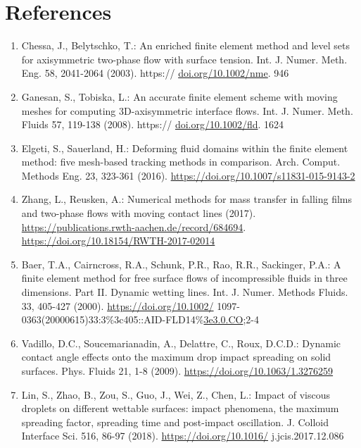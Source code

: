 \documentclass[10pt]{article}
\begin{document}
\section*{References}
\begin{enumerate}
  \item Chessa, J., Belytschko, T.: An enriched finite element method and level sets for axisymmetric two-phase flow with surface tension. Int. J. Numer. Meth. Eng. 58, 2041-2064 (2003). https:// \href{http://doi.org/10.1002/nme}{doi.org/10.1002/nme}. 946

  \item Ganesan, S., Tobiska, L.: An accurate finite element scheme with moving meshes for computing 3D-axisymmetric interface flows. Int. J. Numer. Meth. Fluids 57, 119-138 (2008). https:// \href{http://doi.org/10.1002/fld}{doi.org/10.1002/fld}. 1624

  \item Elgeti, S., Sauerland, H.: Deforming fluid domains within the finite element method: five mesh-based tracking methods in comparison. Arch. Comput. Methods Eng. 23, 323-361 (2016). \href{https://doi.org/10.1007/s11831-015-9143-2}{https://doi.org/10.1007/s11831-015-9143-2}

  \item Zhang, L., Reusken, A.: Numerical methods for mass transfer in falling films and two-phase flows with moving contact lines (2017). \href{https://publications.rwth-aachen.de/record/684694}{https://publications.rwth-aachen.de/record/684694}. \href{https://doi.org/10.18154/RWTH-2017-02014}{https://doi.org/10.18154/RWTH-2017-02014}

  \item Baer, T.A., Cairncross, R.A., Schunk, P.R., Rao, R.R., Sackinger, P.A.: A finite element method for free surface flows of incompressible fluids in three dimensions. Part II. Dynamic wetting lines. Int. J. Numer. Methods Fluids. 33, 405-427 (2000). \href{https://doi.org/10.1002/}{https://doi.org/10.1002/} 1097-0363(20000615)33:3\%3c405::AID-FLD14\%\href{http://3e3.0.CO}{3e3.0.CO};2-4

  \item Vadillo, D.C., Soucemarianadin, A., Delattre, C., Roux, D.C.D.: Dynamic contact angle effects onto the maximum drop impact spreading on solid surfaces. Phys. Fluids 21, 1-8 (2009). \href{https://doi.org/10.1063/1.3276259}{https://doi.org/10.1063/1.3276259}

  \item Lin, S., Zhao, B., Zou, S., Guo, J., Wei, Z., Chen, L.: Impact of viscous droplets on different wettable surfaces: impact phenomena, the maximum spreading factor, spreading time and post-impact oscillation. J. Colloid Interface Sci. 516, 86-97 (2018). \href{https://doi.org/10.1016/}{https://doi.org/10.1016/} j.jcis.2017.12.086


\end{enumerate}
\end{document}
